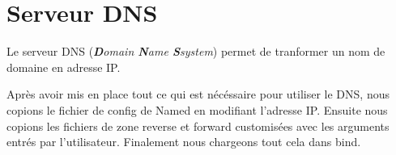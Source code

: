 \section{Serveur DNS}
Le serveur DNS (\textit{\textbf{D}omain \textbf{N}ame \textbf{S}system}) permet de tranformer un nom de domaine en adresse IP.



Après avoir mis en place tout ce qui est nécéssaire pour utiliser le DNS, nous copions le fichier de config de Named en modifiant l'adresse IP. Ensuite nous copions les fichiers de zone reverse et forward customisées avec les arguments entrés par l'utilisateur. 
Finalement nous chargeons tout cela dans bind.
